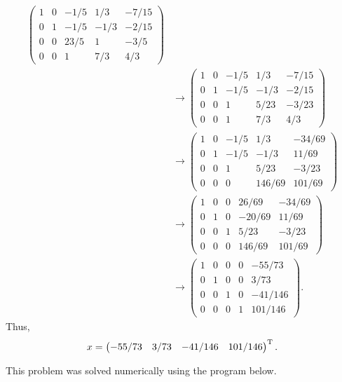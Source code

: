 \begin{align}
    \begin{pmatrix}
        1 & 0 & -1/5 & 1/3 & -7/15 \\
        0 & 1 & -1/5 & -1/3 & -2/15 \\
        0 & 0 & 23/5 & 1 & -3/5 \\
        0 & 0 & 1 & 7/3 & 4/3
    \end{pmatrix}
    \\
    &\rightarrow
    \begin{pmatrix}
        1 & 0 & -1/5 & 1/3 & -7/15 \\
        0 & 1 & -1/5 & -1/3 & -2/15 \\
        0 & 0 & 1 & 5/23 & -3/23 \\
        0 & 0 & 1 & 7/3 & 4/3
    \end{pmatrix}
    \\
    &\rightarrow
    \begin{pmatrix}
        1 & 0 & -1/5 & 1/3 & -34/69 \\
        0 & 1 & -1/5 & -1/3 & 11/69 \\
        0 & 0 & 1 & 5/23 & -3/23 \\
        0 & 0 & 0 & 146/69 & 101/69
    \end{pmatrix}
    \\
    &\rightarrow
    \begin{pmatrix}
        1 & 0 & 0 & 26/69 & -34/69 \\
        0 & 1 & 0 & -20/69 & 11/69 \\
        0 & 0 & 1 & 5/23 & -3/23 \\
        0 & 0 & 0 & 146/69 & 101/69
    \end{pmatrix}
    \\
    &\rightarrow
    \begin{pmatrix}
        1 & 0 & 0 & 0 & -55/73 \\
        0 & 1 & 0 & 0 & 3/73 \\
        0 & 0 & 1 & 0 & -41/146 \\
        0 & 0 & 0 & 1 & 101/146 
    \end{pmatrix}
.\end{align}
Thus, 
\begin{eqnarray}
    \label{eq:x-sol}
    x = 
    \begin{pmatrix}
        -55/73 & 3/73 & -41/146 & 101/146    
    \end{pmatrix}^{\rm T}
.\end{eqnarray}

This problem was solved numerically using the program below.


